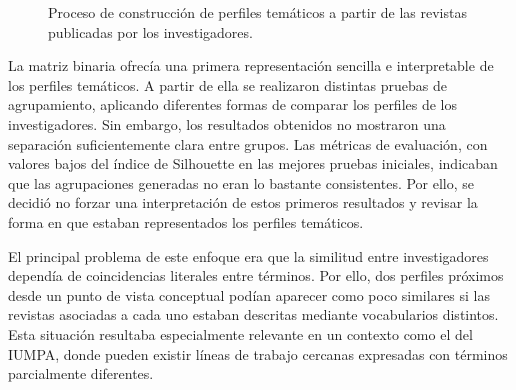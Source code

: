 \documentclass[11pt,spanish,listoffigures,listoftables]{tfgetsinf}
\begin{document}
\begin{figure}[H]
\centering
\small
{}
\caption{Proceso de construcción de perfiles temáticos a partir de las revistas publicadas por los investigadores.}
\label{fig:flujo_representacion_tematica}
\end{figure}

La matriz binaria ofrecía una primera representación sencilla e interpretable de los perfiles temáticos. A partir de ella se realizaron distintas pruebas de agrupamiento, aplicando diferentes formas de comparar los perfiles de los investigadores. Sin embargo, los resultados obtenidos no mostraron una separación suficientemente clara entre grupos. Las métricas de evaluación, con valores bajos del índice de Silhouette en las mejores pruebas iniciales, indicaban que las agrupaciones generadas no eran lo bastante consistentes. Por ello, se decidió no forzar una interpretación de estos primeros resultados y revisar la forma en que estaban representados los perfiles temáticos.

El principal problema de este enfoque era que la similitud entre investigadores dependía de coincidencias literales entre términos. Por ello, dos perfiles próximos desde un punto de vista conceptual podían aparecer como poco similares si las revistas asociadas a cada uno estaban descritas mediante vocabularios distintos. Esta situación resultaba especialmente relevante en un contexto como el del IUMPA, donde pueden existir líneas de trabajo cercanas expresadas con términos parcialmente diferentes.
\end{document}
